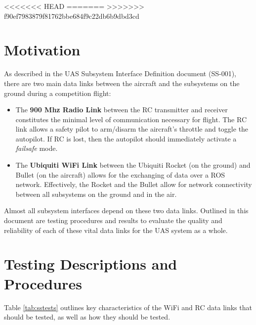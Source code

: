 \documentclass[]{auvsi_doc}
\begin{document}
\begin{AUVSITitlePage}
\begin{artifacttable}
<<<<<<< HEAD
=======
>>>>>>> f90ef7983879f81762bbe684f9c22db6b9dbd3cd
\end{artifacttable}
\end{AUVSITitlePage}

\section{Motivation}

As described in the UAS Subsystem Interface Definition document (SS-001), there are two main data links between the aircraft and the subsystems on the ground during a competition flight:

\begin{itemize}
	\item The \textbf{900 Mhz Radio Link} between the RC transmitter and receiver constitutes the minimal level of communication necessary for flight. The RC link allows a safety pilot to arm/disarm the aircraft's throttle and toggle the autopilot. If RC is lost, then the autopilot should immediately activate a \textit{failsafe} mode.
	\item The \textbf{Ubiquiti WiFi Link} between the Ubiquiti Rocket (on the ground) and Bullet (on the aircraft) allows for the exchanging of data over a ROS network. Effectively, the Rocket and the Bullet allow for network connectivity between all subsystems on the ground and in the air.
\end{itemize}

Almost all subsystem interfaces depend on these two data links. Outlined in this document are testing procedures and results to evaluate the quality and reliability of each of these vital data links for the UAS system as a whole.

\section{Testing Descriptions and Procedures}

Table \ref{tab:sstests} outlines key characteristics of the WiFi and RC data links that should be tested, as well as how they should be tested.
\end{document}
